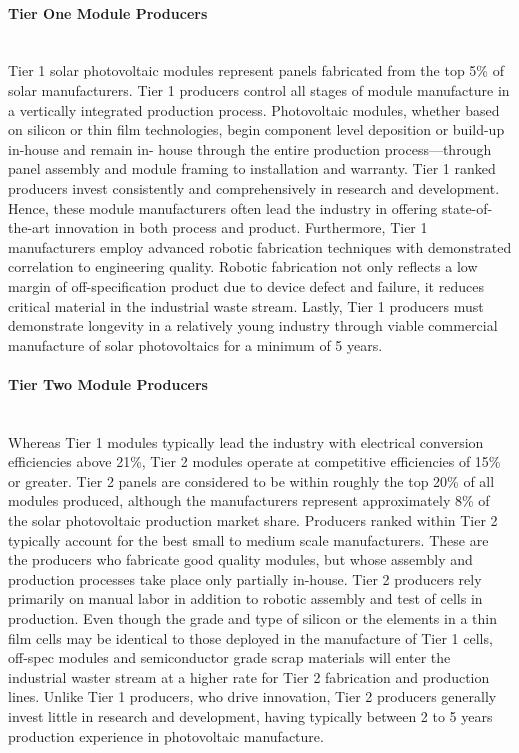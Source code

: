 \paragraph{Tier One Module Producers}\mbox{ }\\
Tier 1 solar photovoltaic modules represent panels fabricated from the top 5\% of solar manufacturers. Tier 1 producers control all stages of module manufacture in a vertically integrated production process. Photovoltaic modules, whether based on silicon or thin film technologies, begin component level deposition or build-up in-house and remain in- house through the entire production process—through panel assembly and module framing to installation and warranty. Tier 1 ranked producers invest consistently and comprehensively in research and development. Hence, these module manufacturers often lead the industry in offering state-of-the-art innovation in both process and product. Furthermore, Tier 1 manufacturers employ advanced robotic fabrication techniques with demonstrated correlation to engineering quality. Robotic fabrication not only reflects a low margin of off-specification product due to device defect and failure, it reduces critical material in the industrial waste stream. Lastly, Tier 1 producers must demonstrate longevity in a relatively young industry through viable commercial manufacture of solar photovoltaics for a minimum of 5 years.

\paragraph{Tier Two Module Producers}\mbox{ }\\
Whereas Tier 1 modules typically lead the industry with electrical conversion efficiencies above 21\%, Tier 2 modules operate at competitive efficiencies of 15\% or greater. Tier 2 panels are considered to be within roughly the top 20\% of all modules produced, although the manufacturers represent approximately 8\% of the solar photovoltaic production market share. Producers ranked within Tier 2 typically account for the best small to medium scale manufacturers. These are the producers who fabricate good quality modules, but whose assembly and production processes take place only partially in-house. Tier 2 producers rely primarily on manual labor in addition to robotic assembly and test of cells in production. Even though the grade and type of silicon or the elements in a thin film cells may be identical to those deployed in the manufacture of Tier 1 cells, off-spec modules and semiconductor grade scrap materials will enter the industrial waster stream at a higher rate for Tier 2 fabrication and production lines. Unlike Tier 1 producers, who drive innovation, Tier 2 producers generally invest little in research and development, having typically between 2 to 5 years production experience in photovoltaic manufacture.

